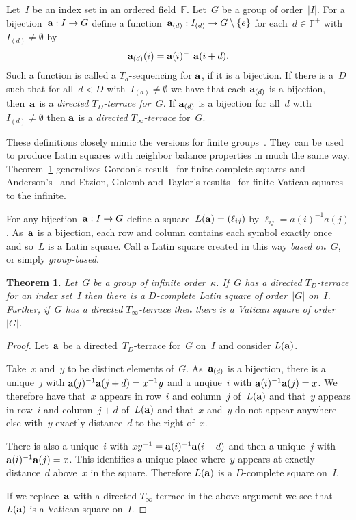 \documentclass[12pt,a4paper]{article}
\newtheorem{thm}{Theorem}[section]
\newcommand{\F}{\mathbb{F}}
\renewcommand{\a}{\textup{\textbf{a}}}
\begin{document}
Let~$I$ be an index set in an ordered field~$\F$.  Let~$G$ be a group of order~$|I|$.  For a bijection~${\bf a}: I \rightarrow G$ define a function~${\bf a}_{(d)}: I_{(d)} \rightarrow G \setminus \{ e \}$ for each~$d \in \F^+$ with~$I_{(d)} \neq \emptyset$ by
$${\bf a}_{(d)}(i) = {\bf a}(i)^{-1}{\bf a}(i+d).$$ Such a function is called a $T_d$-sequencing for $\a$, if it is a bijection.
If there is a~$D$ such that for all~$d < D$ with~$I_{(d)} \neq \emptyset$ we have that each ${\bf a}_{(d)}$ is a bijection, then~${\bf a}$ is a {\em directed $T_D$-terrace for~$G$}.  If ${\bf a}_{(d)}$ is a bijection for all~$d$  with~$I_{(d)} \neq \emptyset$ then ${\bf a}$ is  a {\em directed $T_{\infty}$-terrace} for~$G$.

These definitions closely mimic the versions for finite groups~\cite{Anderson90}.   They can be used to produce Latin squares with neighbor balance properties in much the same way.  Theorem~\ref{th:terrace2square} generalizes Gordon's result~\cite{Gordon61} for finite complete squares and Anderson's~\cite{Anderson90} and Etzion, Golomb and Taylor's results~\cite{EGT89} for finite Vatican squares to the infinite.  

For any bijection~${\bf a}: I \rightarrow G$ define a square~$L({\bf a}) = (\ell_{ij})$ by $\ell_{ij} = a(i)^{-1}a(j)$.   As~${\bf a}$ is a bijection, each row and column contains each symbol exactly once and so~$L$ is a Latin square.  Call a Latin square created in this way {\em based on~$G$}, or simply {\em group-based}.

\begin{thm}\label{th:terrace2square}
Let~$G$ be a group of infinite order~$\kappa$.  If~$G$ has a directed $T_{D}$-terrace for an index set~$I$ then there is a $D$-complete Latin square of order~$|G|$ on~$I$.  Further, if~$G$ has a directed $T_{\infty}$-terrace then there is a Vatican square of order~$|G|$.
\end{thm}

\begin{proof}
Let~${\bf a}$ be a directed~$T_D$-terrace for~$G$ on~$I$ and consider $L({\bf a})$.

Take~$x$ and~$y$ to be distinct elements of~$G$.  As~${\bf a}_{(d)}$ is a bijection, there is a unique~$j$ with ${\bf a}(j)^{-1}{\bf a}(j+d) = x^{-1}y$ and a unqiue~$i$ with ${\bf a}(i)^{-1}{\bf a}(j)=x$.  We therefore have that~$x$ appears in row~$i$ and column~$j$ of~$L({\bf a})$ and that~$y$ appears in row~$i$ and column~$j+d$ of~$L({\bf a})$ and that~$x$ and~$y$ do not appear anywhere else with~$y$ exactly distance~$d$  to the right of~$x$.

There is also a unique~$i$ with $xy^{-1} = {\bf a}(i)^{-1}{\bf a}(i+d)$ and then a unique~$j$ with ${\bf a}(i)^{-1}{\bf a}(j)=x$.  This identifies a unique place where~$y$ appears at exactly distance~$d$ above~$x$ in the square.  Therefore $L({\bf a})$ is a $D$-complete square on~$I$.

If we replace~${\bf a}$ with a directed $T_{\infty}$-terrace in the above argument we see that~$L({\bf a})$ is a Vatican square on~$I$.
\end{proof}
\end{document}
